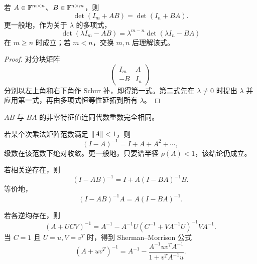 \begin{theorem}
若 $A\in\mathbb F^{m\times n}$、$B\in\mathbb F^{n\times m}$，则
\begin{equation}
 \det(I_m+AB)=\det(I_n+BA).
\end{equation}
更一般地，作为关于 $\lambda$ 的多项式，
\begin{equation}
 \det(\lambda I_m-AB)
 =\lambda^{m-n}\det(\lambda I_n-BA)
\end{equation}
在 $m\geq n$ 时成立；若 $m<n$，交换 $m,n$ 后理解该式。
\end{theorem}

\begin{proof}
对分块矩阵
\begin{equation}
 \begin{pmatrix}I_m&A\\-B&I_n\end{pmatrix}
\end{equation}
分别以左上角和右下角作 Schur 补，即得第一式。第二式先在 $\lambda\neq0$ 时提出 $\lambda$ 并应用第一式，再由多项式恒等性延拓到所有 $\lambda$。
\end{proof}

\begin{corollary}
$AB$ 与 $BA$ 的非零特征值连同代数重数完全相同。
\end{corollary}

\begin{proposition}[Neumann 级数]
若某个次乘法矩阵范数满足 $\left\lVert A\right\rVert<1$，则
\begin{equation}
 (I-A)^{-1}=I+A+A^2+\cdots,
\end{equation}
级数在该范数下绝对收敛。更一般地，只要谱半径 $\rho(A)<1$，该结论仍成立。
\end{proposition}

\begin{proposition}[推入恒等式]
若相关逆存在，则
\begin{equation}
 (I-AB)^{-1}=I+A(I-BA)^{-1}B.
\end{equation}
等价地，
\begin{equation}
 (I-AB)^{-1}A=A(I-BA)^{-1}.
\end{equation}
\end{proposition}

\begin{theorem}[Woodbury 公式]
若各逆均存在，则
\begin{equation}
 (A+UCV)^{-1}
 =A^{-1}-A^{-1}U
 (C^{-1}+VA^{-1}U)^{-1}
 VA^{-1}.
\end{equation}
当 $C=1$ 且 $U=u,V=v^T$ 时，得到 Sherman--Morrison 公式
\begin{equation}
 (A+uv^T)^{-1}
 =A^{-1}-\frac{A^{-1}uv^TA^{-1}}
 {1+v^TA^{-1}u}.
\end{equation}
\end{theorem}

